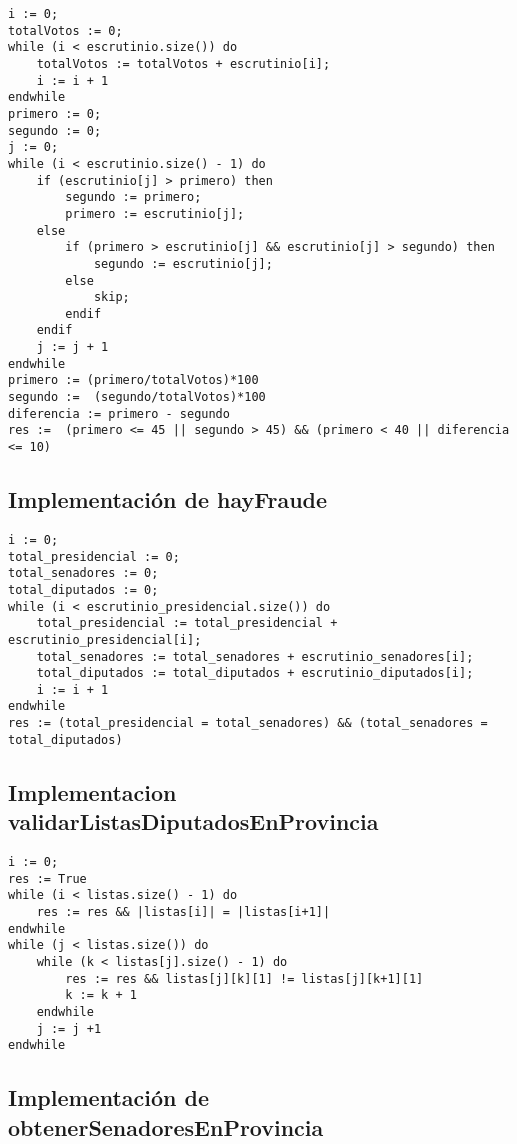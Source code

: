 \documentclass[10pt,a4paper]{article}
\begin{document}
	\begin{lstlisting}[caption={},label=code:for]
i := 0;
totalVotos := 0;
while (i < escrutinio.size()) do
	totalVotos := totalVotos + escrutinio[i];
	i := i + 1
endwhile
primero := 0;
segundo := 0;
j := 0;
while (i < escrutinio.size() - 1) do
	if (escrutinio[j] > primero) then
		segundo := primero;
		primero := escrutinio[j];
	else
		if (primero > escrutinio[j] && escrutinio[j] > segundo) then
			segundo := escrutinio[j];
		else
			skip;
		endif
	endif
	j := j + 1
endwhile
primero := (primero/totalVotos)*100
segundo :=  (segundo/totalVotos)*100
diferencia := primero - segundo
res :=  (primero <= 45 || segundo > 45) && (primero < 40 || diferencia <= 10) 
	\end{lstlisting}

\subsection{Implementación de hayFraude}

	\begin{lstlisting}[caption={},label=code:for]
i := 0;
total_presidencial := 0;
total_senadores := 0;
total_diputados := 0;
while (i < escrutinio_presidencial.size()) do
	total_presidencial := total_presidencial + escrutinio_presidencial[i];
	total_senadores := total_senadores + escrutinio_senadores[i];
	total_diputados := total_diputados + escrutinio_diputados[i];
	i := i + 1
endwhile
res := (total_presidencial = total_senadores) && (total_senadores = total_diputados)
	\end{lstlisting}

\subsection{Implementacion validarListasDiputadosEnProvincia}

	\begin{lstlisting}[caption={},label=code:for]
i := 0;
res := True
while (i < listas.size() - 1) do
	res := res && |listas[i]| = |listas[i+1]|
endwhile
while (j < listas.size()) do
	while (k < listas[j].size() - 1) do
		res := res && listas[j][k][1] != listas[j][k+1][1]
		k := k + 1
	endwhile
	j := j +1
endwhile
	\end{lstlisting}

\subsection{Implementación de obtenerSenadoresEnProvincia}
\end{document}
